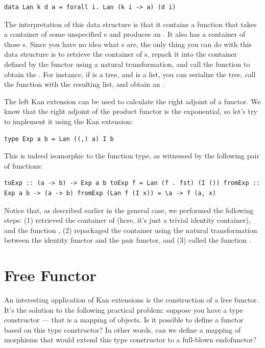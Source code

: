 \begin{verbatim}
data Lan k d a = forall i. Lan (k i -> a) (d i)
\end{verbatim}

The interpretation of this data structure is that it contains a function
that takes a container of some unspecified s and produces an
. It also has a container of those s. Since you have
no idea what s are, the only thing you can do with this data
structure is to retrieve the container of s, repack it into
the container defined by the functor  using a natural
transformation, and call the function to obtain the . For
instance, if  is a tree, and  is a list, you can
serialize the tree, call the function with the resulting list, and
obtain an .

The left Kan extension can be used to calculate the right adjoint of a
functor. We know that the right adjoint of the product functor is the
exponential, so let's try to implement it using the Kan extension:

\begin{verbatim}
type Exp a b = Lan ((,) a) I b
\end{verbatim}

This is indeed isomorphic to the function type, as witnessed by the
following pair of functions:

\begin{verbatim}
toExp :: (a -> b) -> Exp a b toExp f = Lan (f . fst) (I ()) fromExp :: Exp a b -> (a -> b) fromExp (Lan f (I x)) = \a -> f (a, x)
\end{verbatim}

Notice that, as described earlier in the general case, we performed the
following steps: (1) retrieved the container of  (here, it's
just a trivial identity container), and the function , (2)
repackaged the container using the natural transformation between the
identity functor and the pair functor, and (3) called the function
.

\section{Free Functor}\label{free-functor}

An interesting application of Kan extensions is the construction of a
free functor. It's the solution to the following practical problem:
suppose you have a type constructor --- that is a mapping of objects. Is
it possible to define a functor based on this type constructor? In other
words, can we define a mapping of morphisms that would extend this type
constructor to a full-blown endofunctor?

